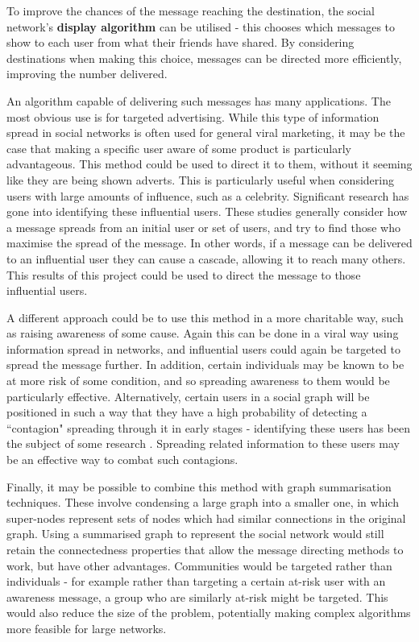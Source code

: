 \documentclass[bsc,frontabs,twoside,singlespacing,parskip,deptreport]{infthesis}     %
\begin{document}
To improve the chances of the message reaching the destination, the social network's \textbf{display algorithm} can be utilised - this chooses which messages to show to each user from what their friends have shared. By considering destinations when making this choice, messages can be directed more efficiently, improving the number delivered.

An algorithm capable of delivering such messages has many applications. The most obvious use is for targeted advertising. While this type of information spread in social networks is often used for general viral marketing, it may be the case that making a specific user aware of some product is particularly advantageous. This method could be used to direct it to them, without it seeming like they are being shown adverts. This is particularly useful when considering users with large amounts of influence, such as a celebrity. Significant research has gone into identifying these influential users\cite{InfluenceMaximisation1, InfluenceMaximisation2, LabelledInfluenceMaximisation}. These studies generally consider how a message spreads from an initial user or set of users, and try to find those who maximise the spread of the message. In other words, if a message can be delivered to an influential user they can cause a cascade, allowing it to reach many others. This results of this project could be used to direct the message to those influential users.

A different approach could be to use this method in a more charitable way, such as raising awareness of some cause. Again this can be done in a viral way using information spread in networks, and influential users could again be targeted to spread the message further. In addition, certain individuals may be known to be at more risk of some condition, and so spreading awareness to them would be particularly effective. Alternatively, certain users in a social graph will be positioned in such a way that they have a high probability of detecting a ``contagion" spreading through it in early stages - identifying these users has been the subject of some research \cite{OutbreakDetection}. Spreading related information to these users may be an effective way to combat such contagions.

Finally, it may be possible to combine this method with graph summarisation techniques\cite{GraphSummary}. These involve condensing a large graph into a smaller one, in which super-nodes represent sets of nodes which had similar connections in the original graph. Using a summarised graph to represent the social network would still retain the connectedness properties that allow the message directing methods to work, but have other advantages. Communities would be targeted rather than individuals - for example rather than targeting a certain at-risk user with an awareness message, a group who are similarly at-risk might be targeted. This would also reduce the size of the problem, potentially making complex algorithms more feasible for large networks.
\end{document}
